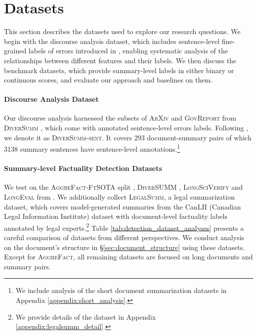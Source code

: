 \section{Datasets}
This section describes the datasets used to explore our research questions. We begin with the discourse analysis dataset, which includes sentence-level fine-grained labels of errors introduced in \citet{pagnoni-etal-2021-understanding}, enabling systematic analysis of the relationships between different features and their labels. We then discuss the benchmark datasets, which provide summary-level labels in either binary or continuous scores, and evaluate our approach and baselines on them.

\paragraph{Discourse Analysis Dataset}\label{token_level_dataset}
Our discourse analysis harnessed the subsets of \textsc{ArXiv} and \textsc{GovReport} from \textsc{DiverSumm} \cite{zhang-etal-2024-fine}, which come with annotated sentence-level errors labels. Following \citet{zhang-etal-2024-fine}, we denote it as \textsc{DiverSumm-sent}.  It covers 293 document-summary pairs of which 3138 summary sentences have sentence-level annotations.\footnote{We include analysis of the short document summarization datasets in Appendix \ref{appendix:short_analysis}.}

\paragraph{Summary-level Factuality Detection Datasets}
We test on the \textsc{AggreFact-FtSOTA} split \cite{tang-etal-2023-understanding},
\textsc{DiverSUMM} \cite{zhang-etal-2024-fine}, \textsc{LongSciVerify} and \textsc{LongEval} from \citet{bishop-etal-2024-longdocfactscore-evaluating}. We additionally collect \textsc{LegalSumm}, a legal summarization dataset, which covers model-generated summaries from the CanLII (Canadian Legal Information
Institute) dataset \cite{xu2021, elaraby-etal-2023-towards} with document-level factuality labels annotated by legal experts.\footnote{We provide details of the dataset in Appendix \ref{appendix:legalsumm_detail}.} Table \ref{tab:detection_dataset_analyses} presents a careful comparison of datasets from different perspectives. We conduct analysis on the document's structure in \S\ref{sec:document_structure} using these datasets. Except for \textsc{AggreFact}, all remaining datasets are focused on long documents and summary pairs. 


